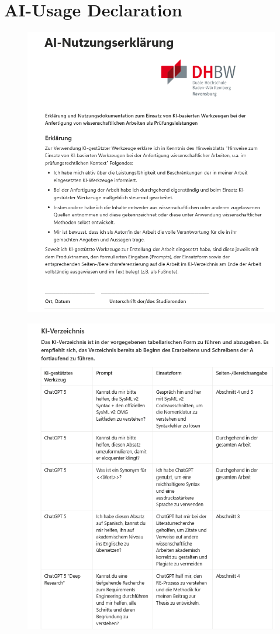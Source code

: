 \section{AI-Usage Declaration}
\begin{figure}[htbp]
  \centering
  \includegraphics[width=0.6\linewidth]{ressources/AI-usage/KI-NE1.png}
\end{figure}
\begin{figure}[htbp]
  \centering
  \includegraphics[width=0.6\linewidth]{ressources/AI-usage/KI-NE2.png}
\end{figure}
